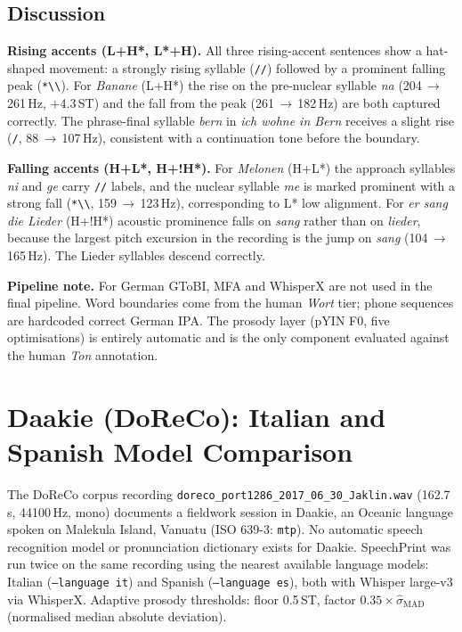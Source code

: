 \section*{Discussion}

\textbf{Rising accents (L+H*, L*+H).}
All three rising-accent sentences show a hat-shaped movement:
a strongly rising syllable (\texttt{//}) followed by a prominent falling peak
(\texttt{*\textbackslash\textbackslash}).
For \textit{Banane} (L+H*) the rise on the pre-nuclear syllable \textit{na}
(204\,$\to$\,261\,Hz, $+$4.3\,ST) and the fall from the peak
(261\,$\to$\,182\,Hz) are both captured correctly.
The phrase-final syllable \textit{bern} in \textit{ich wohne in Bern}
receives a slight rise (\texttt{/}, 88\,$\to$\,107\,Hz), consistent with a
continuation tone before the boundary.

\textbf{Falling accents (H+L*, H+!H*).}
For \textit{Melonen} (H+L*) the approach syllables \textit{ni} and \textit{ge}
carry \texttt{//} labels, and the nuclear syllable \textit{me} is marked
prominent with a strong fall (\texttt{*\textbackslash\textbackslash},
159\,$\to$\,123\,Hz), corresponding to L* low alignment.
For \textit{er sang die Lieder} (H+!H*) acoustic prominence falls on
\textit{sang} rather than on \textit{lieder}, because the largest pitch
excursion in the recording is the jump on \textit{sang} (104\,$\to$\,165\,Hz).
The Lieder syllables descend correctly.

\textbf{Pipeline note.}
For German GToBI, MFA and WhisperX are not used in the final pipeline. Word
boundaries come from the human \textit{Wort} tier; phone sequences are
hardcoded correct German IPA. The prosody layer (pYIN F0, five optimisations)
is entirely automatic and is the only component evaluated against the
human \textit{Ton} annotation.


\chapter{Daakie (DoReCo): Italian and Spanish Model Comparison}
\label{app:daakie}

The DoReCo corpus recording
\texttt{doreco\_port1286\_2017\_06\_30\_Jaklin.wav} (162.7\,s, 44100\,Hz, mono)
documents a fieldwork session in Daakie, an Oceanic language spoken on Malekula
Island, Vanuatu (ISO 639-3: \texttt{mtp}).
No automatic speech recognition model or pronunciation dictionary exists for Daakie.
SpeechPrint was run twice on the same recording using the nearest available
language models: Italian (\texttt{--language it}) and Spanish
(\texttt{--language es}), both with Whisper large-v3 via WhisperX.
Adaptive prosody thresholds: floor 0.5\,ST,
factor $0.35 \times \hat{\sigma}_\mathrm{MAD}$ (normalised median absolute deviation).

